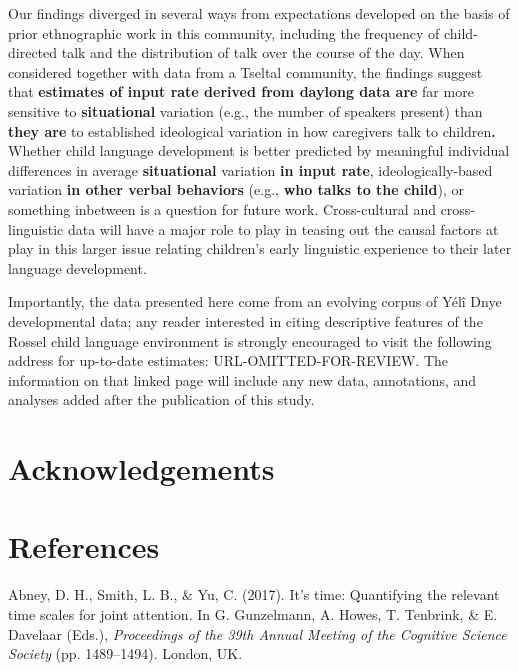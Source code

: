 \documentclass[,man,floatsintext]{apa6}
\begin{document}
Our findings diverged in several ways from expectations developed on the
basis of prior ethnographic work in this community, including the
frequency of child-directed talk and the distribution of talk over the
course of the day. When considered together with data from a Tseltal
community, the findings suggest that \textbf{estimates of input rate
derived from daylong data are} far more sensitive to
\textbf{situational} variation (e.g., the number of speakers present)
than \textbf{they are} to established ideological variation in how
caregivers talk to children\textbf{.} Whether child language development
is better predicted by meaningful individual differences in average
\textbf{situational} variation \textbf{in input rate},
ideologically-based variation \textbf{in other verbal behaviors} (e.g.,
\textbf{who talks to the child}), or something inbetween is a question
for future work. Cross-cultural and cross-linguistic data will have a
major role to play in teasing out the causal factors at play in this
larger issue relating children's early linguistic experience to their
later language development.

Importantly, the data presented here come from an evolving corpus of
Yélî Dnye developmental data; any reader interested in citing
descriptive features of the Rossel child language environment is
strongly encouraged to visit the following address for up-to-date
estimates: URL-OMITTED-FOR-REVIEW. The information on that linked page
will include any new data, annotations, and analyses added after the
publication of this study.

\section{Acknowledgements}\label{acknowledgements}

\newpage

\section{References}\label{refs}

\begingroup
\setlength{\parindent}{-0.5in} \setlength{\leftskip}{0.5in}

\hypertarget{refs}{}
\hypertarget{ref-abney2017time}{}
Abney, D. H., Smith, L. B., \& Yu, C. (2017). It's time: Quantifying the
relevant time scales for joint attention. In G. Gunzelmann, A. Howes, T.
Tenbrink, \& E. Davelaar (Eds.), \emph{Proceedings of the 39th Annual
Meeting of the Cognitive Science Society} (pp. 1489--1494). London, UK.
\end{document}

